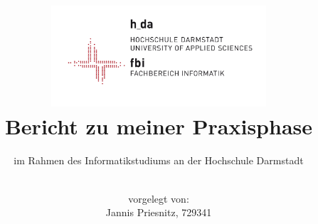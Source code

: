 \documentclass[a4paper,12pt]{article}
\title{\includegraphics[width = 0.6\textwidth]{Abb/logo_fbi.jpg} \\[1cm] \huge 
		Bericht zu meiner Praxisphase
		}
\author{\\ vorgelegt von: \\[5mm]Jannis Priesnitz, 729341}
\date{}
\subtitle{im Rahmen des Informatikstudiums an der Hochschule Darmstadt}
\begin{document}
	




\newpage		
\tableofcontents




\nocite{*}



\listoftodos
	
\end{document}
